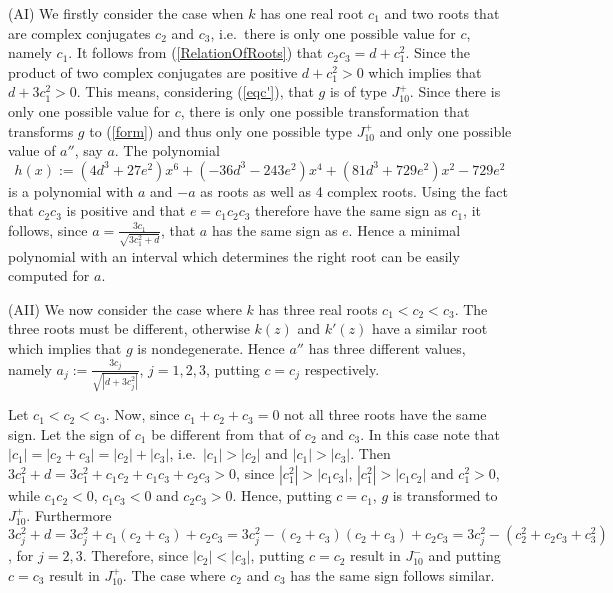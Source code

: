 \documentclass[noend]{amsproc}
\theoremstyle{definition}
\begin{document}
(AI) We firstly consider the case when $k$ has one real root $c_1$ and two
roots that are complex conjugates $c_2$ and $c_3$, i.e.~there is only one
possible value for $c$, namely $c_1$. It follows from (\ref{RelationOfRoots})
that $c_2c_3=d+c_1^2$. Since the product of two complex conjugates are positive
$d+c_1^2>0$ which implies that $d+3c_1^2>0$. This means, considering
(\ref{eqc'}), that $g$ is of type $J_{10}^+$. Since there is only one possible
value for $c$, there is only one possible transformation that transforms $g$ to
(\ref{form}) and thus only one possible type $J_{10}^+$ and only one possible
value of $a''$, say $a$. The polynomial
\[h(x):=(4d^3+27e^2)x^6+(-36d^3-243e^2)x^4+(81d^3+729e^2)x^2-729e^2\]
is a  polynomial with $a$ and $-a$ as roots as well as 4 complex roots. Using the fact that $c_2c_3$ is positive and that $e=c_1c_2c_3$ therefore have the same sign as $c_1$, it follows, since $a=\frac{3c_1}{\sqrt{3c_1^2+d}}$, that $a$ has the same sign as $e$. Hence a minimal polynomial with an interval which determines the right root can be easily computed for $a$. 

(AII) We now consider the case where $k$ has three real roots $c_1<c_2<c_3$.
The three roots must be different, otherwise $k(z)$ and $k'(z)$ have a similar
root which implies that $g$ is nondegenerate. Hence $a''$ has three different values, namely
$a_j:=\frac{3c_j}{\sqrt{|d+3c_j^2|}}$, $j=1,2,3$, putting $c=c_j$ respectively.

Let $c_1<c_2<c_3$. Now, since $c_1+c_2+c_3=0$ not all three roots have the same
sign. Let the sign of $c_1$ be different from that of $c_2$ and $c_3$. In this
case note that $|c_1|=|c_2+c_3|=|c_2|+|c_3|$, i.e.~$|c_1|>|c_2|$ and
$|c_1|>|c_3|$. Then $3c_1^2+d=3c_1^2+c_1c_2+c_1c_3+c_2c_3>0$, since
$|c_1^2|>|c_1c_3|$, $|c_1^2|>|c_1c_2|$ and $c_1^2>0$, while $c_1c_2<0$,
$c_1c_3<0$ and $c_2c_3>0$. Hence, putting $c=c_1$, $g$ is transformed to
$J_{10}^+$.
Furthermore
$3c_j^2+d=3c_j^2+c_1(c_2+c_3)+c_2c_3=3c_j^2-(c_2+c_3)(c_2+c_3)+c_2c_3
=3c_j^2-(c_2^2+c_2c_3+c_3^2)$,
for $j=2,3$. Therefore, since $|c_2|<|c_3|$, putting $c=c_2$ result in
$J_{10}^-$ and putting $c=c_3$ result in $J_{10}^+$. The case where $c_2$ and $c_3$ has the same sign follows similar. 
\end{document}
